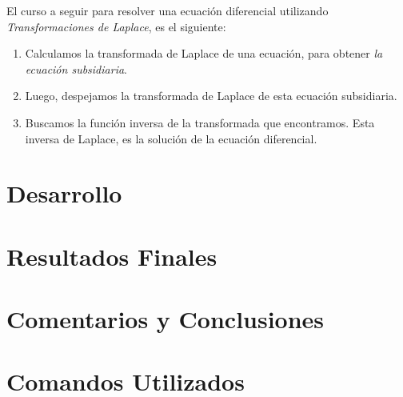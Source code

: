 \documentclass[12pt,letterpaper]{article}
\begin{document}
El curso a seguir para resolver una ecuación diferencial utilizando \textit{Transformaciones de Laplace}, es el siguiente:

\begin{enumerate}
	\item Calculamos la transformada de Laplace de una ecuación, para obtener \textit{la ecuación subsidiaria}.
	\item Luego, despejamos la transformada de Laplace de esta ecuación subsidiaria.
	\item Buscamos la función inversa de la transformada que encontramos. Esta inversa de Laplace, es la solución de la ecuación diferencial.
\end{enumerate}


\section{Desarrollo}

\section{Resultados Finales}

\section{Comentarios y Conclusiones}

\section{Comandos Utilizados}
\end{document}
